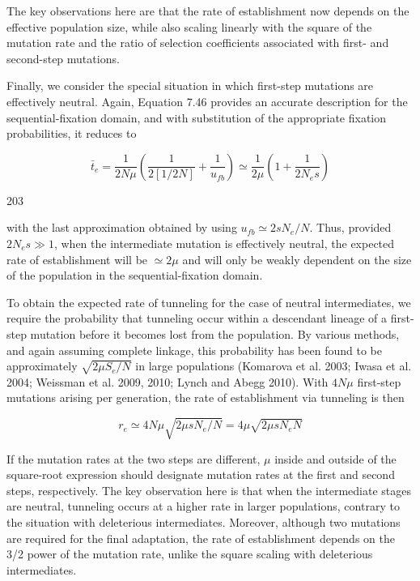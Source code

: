 \documentclass{article}
\begin{document}
The key observations here are that the rate of establishment now depends on the effective population size, while also scaling linearly with the square of the mutation rate and the ratio of selection coefficients associated with first- and second-step mutations.

Finally, we consider the special situation in which first-step mutations are effectively neutral. Again, Equation 7.46 provides an accurate description for the sequential-fixation domain, and with substitution of the appropriate fixation probabilities, it reduces to

\begin{equation}
\bar{t}_{e}=\frac{1}{2N\mu}\left(\frac{1}{2[1/2N]}+\frac{1}{u_{fb}}\right)\simeq\frac{1}{2\mu}\left(1+\frac{1}{2N_{e}s}\right)
\tag{7.51}
\label{eq:7_51}
\end{equation}

203

with the last approximation obtained by using  $ u_{fb} \simeq 2sN_e/N $. Thus, provided  $ 2N_e s \gg 1 $, when the intermediate mutation is effectively neutral, the expected rate of establishment will be  $ \simeq 2\mu $ and will only be weakly dependent on the size of the population in the sequential-fixation domain.

To obtain the expected rate of tunneling for the case of neutral intermediates, we require the probability that tunneling occur within a descendant lineage of a first-step mutation before it becomes lost from the population. By various methods, and again assuming complete linkage, this probability has been found to be approximately  $ \sqrt{2\mu S_{e}/N} $ in large populations (Komarova et al. 2003; Iwasa et al. 2004; Weissman et al. 2009, 2010; Lynch and Abegg 2010). With  $ 4N\mu $ first-step mutations arising per generation, the rate of establishment via tunneling is then

\begin{equation}
r_{e}\simeq4N\mu\sqrt{2\mu s N_{e}/N}=4\mu\sqrt{2\mu s N_{e}N}
\tag{7.52}
\label{eq:7_52}
\end{equation}

If the mutation rates at the two steps are different,  $ \mu $ inside and outside of the square-root expression should designate mutation rates at the first and second steps, respectively. The key observation here is that when the intermediate stages are neutral, tunneling occurs at a higher rate in larger populations, contrary to the situation with deleterious intermediates. Moreover, although two mutations are required for the final adaptation, the rate of establishment depends on the 3/2 power of the mutation rate, unlike the square scaling with deleterious intermediates.
\end{document}
